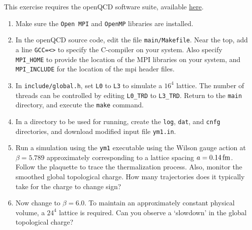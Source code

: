 This exercise requires the openQCD software suite, available \href{https://luscher.web.cern.ch/luscher/openQCD/openQCD-2.4.2.tar.gz}{here}.

\begin{enumerate}
	\item Make sure the \texttt{Open MPI} and \texttt{OpenMP} libraries are installed.
	\item In the openQCD source code, edit the file \texttt{main/Makefile}.
	      Near the top, add a line \texttt{GCC=<>} to specify the C-compiler on your
	      system. Also specify \texttt{MPI\_HOME} to provide the location of the MPI libraries on your system, and \texttt{MPI\_INCLUDE} for the location of the mpi header files.
	\item In \texttt{include/global.h}, set \texttt{L0} to \texttt{L3} to simulate a $16^4$ lattice. The number of threads can be controlled by editing \texttt{L0\_TRD} to \texttt{L3\_TRD}. Return to the \texttt{main} directory, and execute the \texttt{make} command.
	\item In a directory to be used for running, create the \texttt{log}, \texttt{dat}, and \texttt{cnfg} directories, and download modified input file
	      \texttt{ym1.in}.
	\item Run a simulation using the \texttt{ym1} executable using the Wilson gauge action at $\beta=5.789$ approximately corresponding to a lattice spacing $a=0.14\,{\rm fm}$. Follow the plaquette to trace the thermalization process. Also, monitor the smoothed global topological charge. How many trajectories does it typically take for the charge to change sign?
	\item  Now change to $\beta=6.0$. To maintain an approximately constant physical volume, a $24^4$ lattice is required. Can you observe a `slowdown' in the global topological charge?
\end{enumerate}